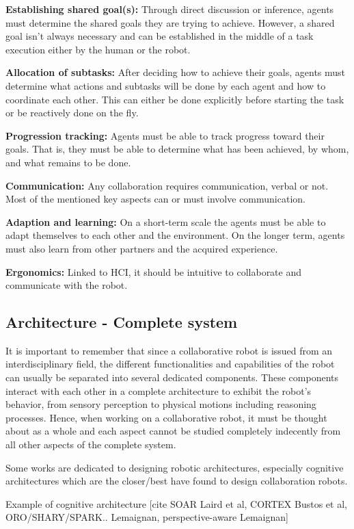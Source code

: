 \textbf{Establishing shared goal(s):} Through direct discussion or inference, agents must determine the shared goals they are trying to achieve. However, a shared goal isn't always necessary and can be established in the middle of a task execution either by the human or the robot.

\textbf{Allocation of subtasks:} After deciding how to achieve their goals, agents must determine what actions and subtasks will be done by each agent and how to coordinate each other. This can either be done explicitly before starting the task or be reactively done on the fly.

\textbf{Progression tracking:} Agents must be able to track progress toward their goals. That is, they must be able to determine what has been achieved, by whom, and what remains to be done. 

\textbf{Communication:} Any collaboration requires communication, verbal or not. Most of the mentioned key aspects can or must involve communication.

\textbf{Adaption and learning:} On a short-term scale the agents must be able to adapt themselves to each other and the environment. On the longer term, agents must also learn from other partners and the acquired experience.

\textbf{Ergonomics:} Linked to HCI, it should be intuitive to collaborate and communicate with the robot. 

\subsection{Architecture - Complete system}

It is important to remember that since a collaborative robot is issued from an interdisciplinary field, the different functionalities and capabilities of the robot can usually be separated into several dedicated components. These components interact with each other in a complete architecture to exhibit the robot's behavior, from sensory perception to physical motions including reasoning processes. 
Hence, when working on a collaborative robot, it must be thought about as a whole and each aspect cannot be studied completely indecently from all other aspects of the complete system. 

Some works are dedicated to designing robotic architectures, especially cognitive architectures which are the closer/best have found to design collaboration robots. 

Example of cognitive architecture
[cite SOAR Laird et al, CORTEX Bustos et al, ORO/SHARY/SPARK.. Lemaignan, perspective-aware Lemaignan]

